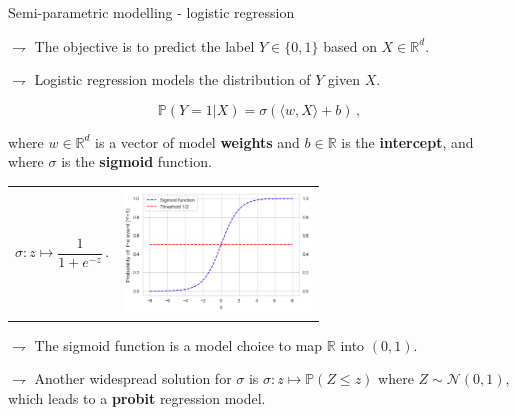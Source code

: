\documentclass[9pt]{beamer}
\newcommand\R{\mathds{R}}
\renewcommand{\P}{\mathds{P}}
\begin{document}
\begin{frame}{Semi-parametric modelling - logistic regression}


$\rightharpoondown$ The objective is to \alert{predict the  label $Y\in\{0,1\}$} based on $X\in\mathbb{R}^d$.

$\rightharpoondown$ Logistic regression \alert{models the distribution of $Y$ given $X$}.

\vspace{-.2cm}

\begin{equation*}
\P(Y = 1| X) = \sigma(\langle w,X \rangle + b)\,,
\end{equation*}

where $w \in \R^d$ is a vector of model \textbf{weights} and $b \in \R$ is the \textbf{intercept}, and where $\sigma$ is the \textbf{sigmoid} function.

\vspace{.3cm}
 
\begin{tabular}{cc}
	\begin{minipage}{0.4\textwidth}
		\begin{equation*}
		\sigma: z \mapsto \frac{1}{1 + e^{-z}}\,.
		\end{equation*}%
	\end{minipage}
	&
	\begin{minipage}{0.4\textwidth}
		\includegraphics[width=5cm]{./sigmoid.png}  
	\end{minipage}    
\end{tabular}

$\rightharpoondown$ The sigmoid function is a \alert{model choice to map $\mathbb{R}$ into $(0,1)$}.

$\rightharpoondown$ Another widespread solution for $\sigma$ is $\sigma: z \mapsto  \P( Z \leqslant z)$ where $Z\sim \mathcal{N}(0,1)$, which leads to a \textbf{probit} regression model.

\end{frame}
\end{document}
